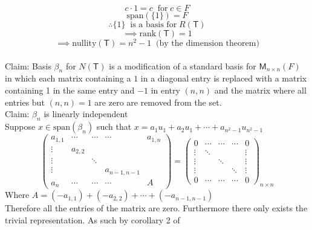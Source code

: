 \begin{enumerate}[(a)]
\begin{equation}
c\cdot 1= c\;\;\text{for}\; c \in F
\end{equation}
\begin{equation}
\text{span}(\{1\}) = F
\end{equation}
\begin{equation}\label{onto}
\therefore \{1\}\;\;\text{is a basis for}\; R(\mathsf{T})
\end{equation}
\begin{equation}
\implies \text{rank}(\mathsf{T}) =1
\end{equation}
\begin{equation}
\implies \text{nullity}(\mathsf{T})=n^2 -1\;\;\text{(by the dimension theorem)}
\end{equation}
\\Claim: Basis $\beta_n$ for $N(\mathsf{T})$ is a modification of a standard
basis for $\mathsf{M}_{n\times n}(F)$ in which each matrix containing
a $1$ in a diagonal entry is replaced with a matrix containing 1 in the
same entry and $-1$ in entry $(n,n)$ and the matrix where all entries
but $(n,n)=1$ are zero are removed from the set.
\\Claim: $\beta_n$ is linearly independent 
\\Suppose $x \in \text{span}(\beta_n)$ such that
$x=a_1u_1+a_2u_1+\cdots+a_{n^2-1}u_{n^2-1}$
\begin{equation}
\begin{pmatrix}
a_{1,1} &\cdots & \cdots& \cdots& a_{1,n}\\
\vdots & a_{2,2}\\
\vdots &       & \ddots &\\
\vdots &       &        & a_{n-1,n-1}\\
a_n    & \cdots     &    \cdots   &   \cdots       & A
\end{pmatrix}
= \begin{pmatrix}
0 & \cdots & \cdots& \cdots& 0\\
\vdots & \ddots & & & \vdots\\
\vdots & & \ddots & & \vdots\\
\vdots & & & \ddots& \vdots\\
0 & \cdots & \cdots& \cdots& 0
\end{pmatrix}_{n\times n}
\end{equation}
Where $A= (-a_{1,1})+(-a_{2,2})+\cdots+(-a_{n-1,n-1})$
\\
Therefore all the entries of the matrix are zero. Furthermore there
only exists the trivial representation. As such by corollary 2 of

\end{enumerate}
